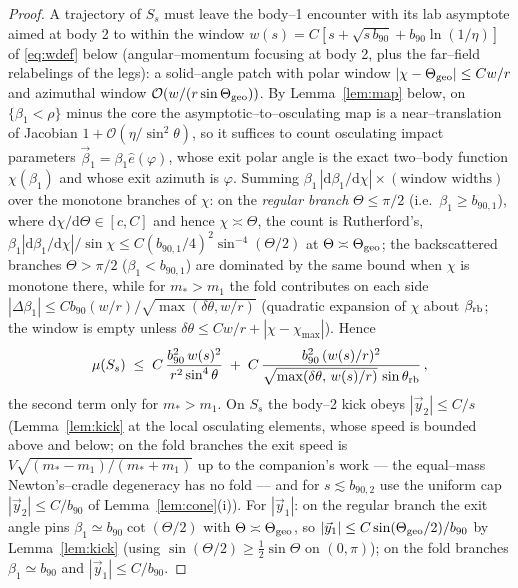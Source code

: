 \documentclass[11pt]{article}
\newcommand{\dd}{\mathrm{d}}
\newcommand{\order}[1]{\mathcal O\!\left(#1\right)}
\begin{document}
\begin{proof}
A trajectory of $S_s$ must leave the body--1 encounter with its lab asymptote aimed at body 2 to
within the window $w(s)=C[s+\sqrt{s\,b_{90}}+b_{90}\ln(1/\eta)]$ of \eqref{eq:wdef} below
(angular--momentum focusing at body 2, plus the far--field relabelings of the legs): a
solid--angle patch with polar window $|\chi-\Theta_{\rm geo}|\le Cw/r$ and azimuthal window
$\order{w/(r\sin\Theta_{\rm geo})}$. By Lemma~\ref{lem:map} below, on $\{\beta_1<\rho\}$ minus the
core the asymptotic--to--osculating map is a near--translation of Jacobian
$1+\order{\eta/\sin^2\theta}$, so it suffices to count osculating impact parameters
$\vec\beta_1=\beta_1\hat e(\varphi)$, whose exit polar angle is the exact two--body function
$\chi(\beta_1)$ and whose exit azimuth is $\varphi$. Summing
$\beta_1\,|\dd\beta_1/\dd\chi|\times(\text{window widths})$ over the monotone branches of $\chi$:
on the \emph{regular branch} $\Theta\le\pi/2$ (i.e.\ $\beta_1\ge b_{90,1}$), where
$\dd\chi/\dd\Theta\in[c,C]$ and hence $\chi\asymp\Theta$, the count is Rutherford's,
$\beta_1|\dd\beta_1/\dd\chi|/\sin\chi\le C(b_{90,1}/4)^2\sin^{-4}(\Theta/2)$ at
$\Theta\asymp\Theta_{\rm geo}$; the backscattered branches $\Theta>\pi/2$ ($\beta_1<b_{90,1}$) are
dominated by the same bound when $\chi$ is monotone there, while for $m_*>m_1$ the fold
contributes on each side $|\Delta\beta_1|\le Cb_{90}(w/r)\big/\sqrt{\max(\delta\theta,w/r)}$
(quadratic expansion of $\chi$ about $\beta_{\rm rb}$; the window is empty unless
$\delta\theta\le Cw/r+|\chi-\chi_{\max}|$). Hence
\begin{equation}
  \mu(S_s)\;\le\;C\,\frac{b_{90}^2\,w(s)^2}{r^2\sin^4\theta}
  \;+\;C\,\frac{b_{90}^2\,(w(s)/r)^2}{\sqrt{\max(\delta\theta,\,w(s)/r)}\,\sin\theta_{\rm rb}}\,,
  \label{eq:seq-measure}
\end{equation}
the second term only for $m_*>m_1$. On $S_s$ the body--2 kick obeys $|\vec y_2|\le C/s$
(Lemma~\ref{lem:kick} at the local osculating elements, whose speed is bounded above and below;
on the fold branches the exit speed is $V\sqrt{(m_*-m_1)/(m_*+m_1)}$ up to the companion's work
--- the equal--mass Newton's--cradle degeneracy has no fold --- and for $s\lesssim b_{90,2}$ use
the uniform cap $|\vec y_2|\le C/b_{90}$ of Lemma~\ref{lem:cone}(i)). For $|\vec y_1|$: on the
regular branch the exit angle pins $\beta_1\simeq b_{90}\cot(\Theta/2)$ with
$\Theta\asymp\Theta_{\rm geo}$, so $|\vec y_1|\le C\sin(\Theta_{\rm geo}/2)/b_{90}$ by
Lemma~\ref{lem:kick} (using $\sin(\Theta/2)\ge\tfrac12\sin\Theta$ on $(0,\pi)$); on the fold
branches $\beta_1\simeq b_{90}$ and $|\vec y_1|\le C/b_{90}$.


\end{proof}
\end{document}
